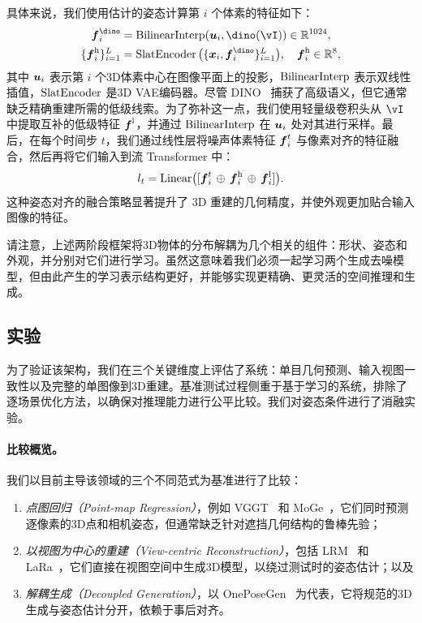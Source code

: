 \documentclass[../../book-main_zh.tex]{subfiles}
\begin{document}
具体来说，我们使用估计的姿态计算第 $i$ 个体素的特征如下：
\begin{equation}
\begin{aligned}
\feat^\dino_{i} &= \interp(\pixcoord_i, \dino(\image)) \in \mathbb{R}^{1024}, \\
\{\feat^{\high}_{i}\}_{i=1}^{\numpts} &= \slatenc\big(\{\point_i, \feat^\dino_i\}_{i=1}^{\numpts}\big), \quad \feat^{\high}_{i} \in \mathbb{R}^{8},
\end{aligned}
\label{eq:latent}
\end{equation}
其中 $\boldsymbol{u}_i$ 表示第 $i$ 个3D体素中心在图像平面上的投影，$\operatorname{BilinearInterp}$ 表示双线性插值，$\operatorname{SlatEncoder}$ 是3D VAE编码器。尽管 DINO~\citep{oquab2023dinov2} 捕获了高级语义，但它通常缺乏精确重建所需的低级线索。为了弥补这一点，我们使用轻量级卷积头从 $\image$ 中提取互补的低级特征 $\boldsymbol{f}^{\mathrm{l}}$，并通过 $\operatorname{BilinearInterp}$ 在 $\boldsymbol{u}_i$ 处对其进行采样。最后，在每个时间步 $t$，我们通过线性层将噪声体素特征 $\boldsymbol{f}_i^{t}$ 与像素对齐的特征融合，然后再将它们输入到流 Transformer 中：
\begin{equation}
l_t = \mathrm{Linear}\big([\boldsymbol{f}_i^{t}\,\oplus\, \boldsymbol{f}^{\mathrm{h}}_{i} \,\oplus\, \boldsymbol{f}^{\mathrm{l}}_{i}]\big).
\end{equation}
这种姿态对齐的融合策略显著提升了 3D 重建的几何精度，并使外观更加贴合输入图像的特征。

\begin{remark}[解耦的生成过程]
请注意，上述两阶段框架将3D物体的分布解耦为几个相关的组件：形状、姿态和外观，并分别对它们进行学习。虽然这意味着我们必须一起学习两个生成去噪模型，但由此产生的学习表示结构更好，并能够实现更精确、更灵活的空间推理和生成。
\end{remark}

\subsection{实验}
\label{sec:experiments}
\label{sec:Evaluation}

为了验证该架构，我们在三个关键维度上评估了系统：单目几何预测、输入视图一致性以及完整的单图像到3D重建。基准测试过程侧重于基于学习的系统，排除了逐场景优化方法，以确保对推理能力进行公平比较。我们对姿态条件进行了消融实验。

\paragraph{比较概览。}
我们以目前主导该领域的三个不同范式为基准进行了比较：
\begin{enumerate}[label=(\roman*)]
    \item \textit{点图回归（Point-map Regression）}，例如 VGGT~\citep{wang2025vggt} 和 MoGe~\citep{wang2025moge}，它们同时预测逐像素的3D点和相机姿态，但通常缺乏针对遮挡几何结构的鲁棒先验；
    \item \textit{以视图为中心的重建（View-centric Reconstruction）}，包括 LRM~\citep{hong2023lrm} 和 LaRa~\citep{LaRa}，它们直接在视图空间中生成3D模型，以绕过测试时的姿态估计；以及
    \item \textit{解耦生成（Decoupled Generation）}，以 OnePoseGen~\citep{geng2025one} 为代表，它将规范的3D生成与姿态估计分开，依赖于事后对齐。
\end{enumerate}
\end{document}
